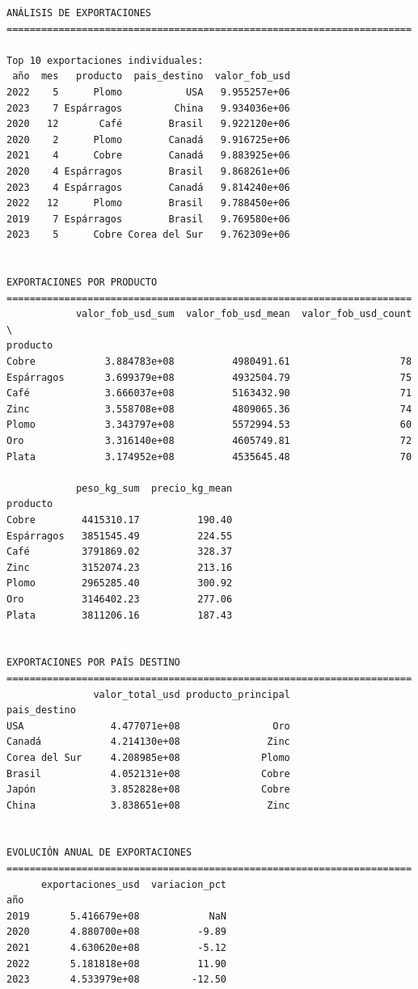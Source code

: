 \documentclass[
  doc,
  floatsintext,
  longtable,
  a4paper,
  nolmodern,
  notxfonts,
  notimes,
  12pt,
  colorlinks=true,linkcolor=blue,citecolor=blue,urlcolor=blue]{apa7}
\begin{document}
\begin{verbatim}
ANÁLISIS DE EXPORTACIONES
======================================================================

Top 10 exportaciones individuales:
 año  mes   producto  pais_destino  valor_fob_usd
2022    5      Plomo           USA   9.955257e+06
2023    7 Espárragos         China   9.934036e+06
2020   12       Café        Brasil   9.922120e+06
2020    2      Plomo        Canadá   9.916725e+06
2021    4      Cobre        Canadá   9.883925e+06
2020    4 Espárragos        Brasil   9.868261e+06
2023    4 Espárragos        Canadá   9.814240e+06
2022   12      Plomo        Brasil   9.788450e+06
2019    7 Espárragos        Brasil   9.769580e+06
2023    5      Cobre Corea del Sur   9.762309e+06


EXPORTACIONES POR PRODUCTO
======================================================================
            valor_fob_usd_sum  valor_fob_usd_mean  valor_fob_usd_count  \
producto                                                                 
Cobre            3.884783e+08          4980491.61                   78   
Espárragos       3.699379e+08          4932504.79                   75   
Café             3.666037e+08          5163432.90                   71   
Zinc             3.558708e+08          4809065.36                   74   
Plomo            3.343797e+08          5572994.53                   60   
Oro              3.316140e+08          4605749.81                   72   
Plata            3.174952e+08          4535645.48                   70   

            peso_kg_sum  precio_kg_mean  
producto                                 
Cobre        4415310.17          190.40  
Espárragos   3851545.49          224.55  
Café         3791869.02          328.37  
Zinc         3152074.23          213.16  
Plomo        2965285.40          300.92  
Oro          3146402.23          277.06  
Plata        3811206.16          187.43  


EXPORTACIONES POR PAÍS DESTINO
======================================================================
               valor_total_usd producto_principal
pais_destino                                     
USA               4.477071e+08                Oro
Canadá            4.214130e+08               Zinc
Corea del Sur     4.208985e+08              Plomo
Brasil            4.052131e+08              Cobre
Japón             3.852828e+08              Cobre
China             3.838651e+08               Zinc


EVOLUCIÓN ANUAL DE EXPORTACIONES
======================================================================
      exportaciones_usd  variacion_pct
año                                   
2019       5.416679e+08            NaN
2020       4.880700e+08          -9.89
2021       4.630620e+08          -5.12
2022       5.181818e+08          11.90
2023       4.533979e+08         -12.50



\end{verbatim}
\end{document}
